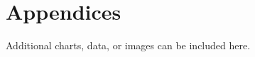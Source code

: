 \documentclass[12pt]{article}
\begin{document}

\listoffigures                                                %
\listoftables                                                 %



\section{Appendices}
Additional charts, data, or images can be included here.
\end{document}
